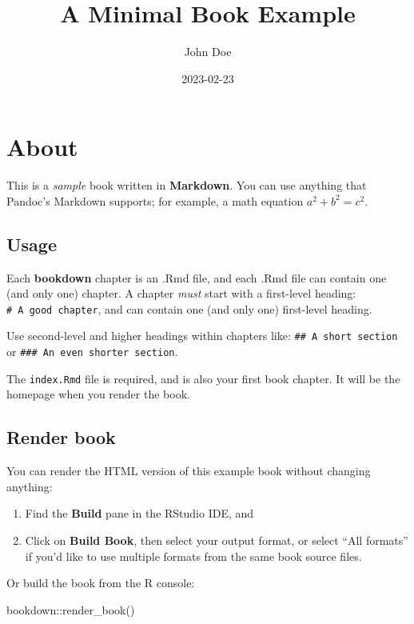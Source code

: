 \documentclass[
]{book}
\title{A Minimal Book Example}
\author{John Doe}
\date{2023-02-23}
\newenvironment{Shaded}{\begin{snugshade}}{\end{snugshade}}
\newcommand{\FunctionTok}[1]{\textcolor[rgb]{0.00,0.00,0.00}{#1}}
\newcommand{\NormalTok}[1]{#1}
\newcommand{\SpecialCharTok}[1]{\textcolor[rgb]{0.00,0.00,0.00}{#1}}
\begin{document}
\maketitle

{
\setcounter{tocdepth}{1}
\tableofcontents
}
\hypertarget{about}{%
\chapter{About}\label{about}}

This is a \emph{sample} book written in \textbf{Markdown}. You can use anything that Pandoc's Markdown supports; for example, a math equation \(a^2 + b^2 = c^2\).

\hypertarget{usage}{%
\section{Usage}\label{usage}}

Each \textbf{bookdown} chapter is an .Rmd file, and each .Rmd file can contain one (and only one) chapter. A chapter \emph{must} start with a first-level heading: \texttt{\#\ A\ good\ chapter}, and can contain one (and only one) first-level heading.

Use second-level and higher headings within chapters like: \texttt{\#\#\ A\ short\ section} or \texttt{\#\#\#\ An\ even\ shorter\ section}.

The \texttt{index.Rmd} file is required, and is also your first book chapter. It will be the homepage when you render the book.

\hypertarget{render-book}{%
\section{Render book}\label{render-book}}

You can render the HTML version of this example book without changing anything:

\begin{enumerate}
\def\labelenumi{\arabic{enumi}.}
\item
  Find the \textbf{Build} pane in the RStudio IDE, and
\item
  Click on \textbf{Build Book}, then select your output format, or select ``All formats'' if you'd like to use multiple formats from the same book source files.
\end{enumerate}

Or build the book from the R console:

\begin{Shaded}
\begin{Highlighting}[]
\NormalTok{bookdown}\SpecialCharTok{::}\FunctionTok{render\_book}\NormalTok{()}
\end{Highlighting}
\end{Shaded}
\end{document}

